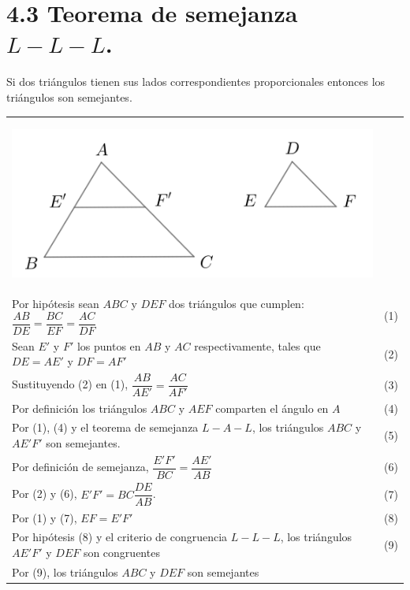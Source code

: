 \documentclass[12pt,a4paper, oneside]{book}
\begin{document}
\section{4.3 Teorema de semejanza $L-L-L$.}
Si dos triángulos tienen sus lados correspondientes proporcionales entonces los triángulos son semejantes.\\
\begin{tabular}{p{15.9cm}p{1cm}}
\\
\begin{center}
\includegraphics[scale=0.75]{Imagenes/semejanza.png} 
\end{center} 
\\Por hipótesis sean $ABC$ y $DEF$ dos triángulos que cumplen: $\dfrac{AB}{DE}=\dfrac{BC}{EF}=\dfrac{AC}{DF}$ & (1)
\\Sean $E'$ y $F'$ los puntos en $AB$ y $AC$ respectivamente, tales que $DE = AE'$ y $DF= AF'$ &(2)
\\Sustituyendo (2) en (1), $\dfrac{AB}{AE'}=\dfrac{AC}{AF'}$&(3)
\\ Por definición los triángulos $ABC$ y $AEF$ comparten el ángulo en $A$ &(4)
\\Por (1), (4) y el teorema de semejanza $L-A-L$, los triángulos $ABC$ y $AE'F'$ son semejantes. &(5)
\\Por definición de semejanza, $\dfrac{E'F'}{BC}=\dfrac{AE'}{AB}$ &(6)
\\Por (2) y (6), $E'F'=BC\dfrac{DE}{AB}$. & (7)
\\Por (1) y (7), $EF=E'F'$ & (8)
\\Por hipótesis (8) y el criterio de congruencia $L-L-L$, los triángulos $AE'F'$ y $DEF$ son congruentes &\medskip(9)
\\Por (9), los triángulos $ABC$ y $DEF$ son semejantes
\end{tabular}
\end{document}
